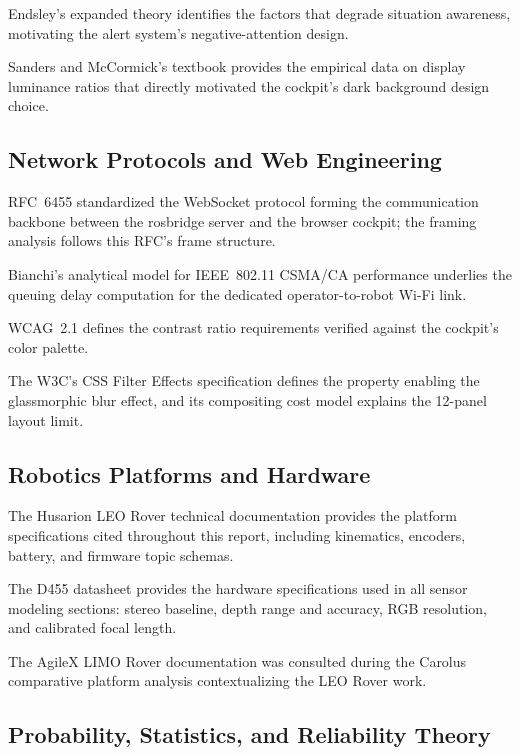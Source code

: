 \textbf{\cite{endsley1995toward}} Endsley's expanded theory identifies the factors that degrade situation awareness, motivating the alert system's negative-attention design.

\textbf{\cite{sanders1993human}} Sanders and McCormick's textbook provides the empirical data on display luminance ratios that directly motivated the cockpit's dark background design choice.

\subsection{Network Protocols and Web Engineering}

\textbf{\cite{fette2011websocket}} RFC~6455 standardized the WebSocket protocol forming the communication backbone between the rosbridge server and the browser cockpit; the framing analysis follows this RFC's frame structure.

\textbf{\cite{bianchi2000performance}} Bianchi's analytical model for IEEE~802.11 CSMA/CA performance underlies the queuing delay computation for the dedicated operator-to-robot Wi-Fi link.

\textbf{\cite{w3c2018wcag}} WCAG~2.1 defines the contrast ratio requirements verified against the cockpit's color palette.

\textbf{\cite{w3c2023backdropfilter}} The W3C's CSS Filter Effects specification defines the  property enabling the glassmorphic blur effect, and its compositing cost model explains the 12-panel layout limit.

\subsection{Robotics Platforms and Hardware}

\textbf{\cite{husarion2021leo}} The Husarion LEO Rover technical documentation provides the platform specifications cited throughout this report, including kinematics, encoders, battery, and firmware topic schemas.

\textbf{\cite{intel2021d455}} The D455 datasheet provides the hardware specifications used in all sensor modeling sections: stereo baseline, depth range and accuracy, RGB resolution, and calibrated focal length.

\textbf{\cite{agilex2021limo}} The AgileX LIMO Rover documentation was consulted during the Carolus comparative platform analysis contextualizing the LEO Rover work.

\subsection{Probability, Statistics, and Reliability Theory}

